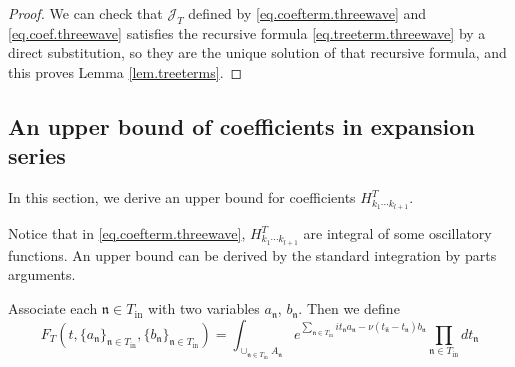\begin{proof}
We can check that $\mathcal{J}_T$ defined by \eqref{eq.coefterm.threewave} and \eqref{eq.coef.threewave} satisfies the recursive formula \eqref{eq.treeterm.threewave} by a direct substitution, so they are the unique solution of that recursive formula, and this proves Lemma \ref{lem.treeterms}.
\end{proof}



\subsection{An upper bound of coefficients in expansion series}\label{sec.uppcoef} In this section, we derive an upper bound for coefficients $H^T_{k_1\cdots k_{l+1}}$.

Notice that in \eqref{eq.coefterm.threewave}, $H^T_{k_1\cdots k_{l+1}}$ are integral of some oscillatory functions. An upper bound can be derived by the standard integration by parts arguments.

Associate each $\mathfrak{n}\in T_{\text{in}}$ with two variables $a_{\mathfrak{n}}$, $b_{\mathfrak{n}}$. Then we define
\begin{equation}\label{eq.defF_T.threewave}
F_{T}(t,\{a_{\mathfrak{n}}\}_{\mathfrak{n}\in T_{\text{in}}},\{b_{\mathfrak{n}}\}_{\mathfrak{n}\in T_{\text{in}}})=\int_{\cup_{\mathfrak{n}\in T_{\text{in}}} A_{\mathfrak{n}}} e^{\sum_{\mathfrak{n}\in T_{\text{in}}} it_{\mathfrak{n}} a_{\mathfrak{n}} - \nu(t_{\widehat{\mathfrak{n}}}-t_{\mathfrak{n}})b_{\mathfrak{n}}} \prod_{\mathfrak{n}\in T_{\text{in}}} dt_{\mathfrak{n}} 
\end{equation}

